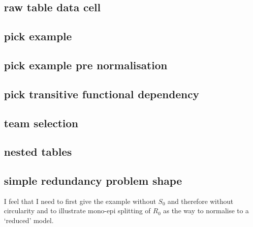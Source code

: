 \documentclass[10pt,a4paper]{article}
\begin{document}
\subsection{raw table data cell}



\subsection{pick example}


\subsection{pick example pre normalisation}


\subsection{pick transitive functional dependency}

\fi

\subsection{team selection}


\iffalse
\needspace{20\baselineskip}
\subsection{nested rows}

\fi


\subsection{nested tables}


\subsection{simple redundancy problem shape}
\begin{newtt}
I feel that I need to first give the example without $S_0$ and therefore without circularity and to illustrate mono-epi splitting of $R_0$ as the way to normalise to a `reduced' model.
\end{newtt}
\end{document}
